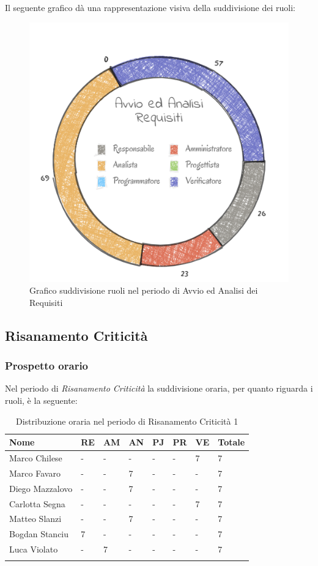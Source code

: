 Il seguente grafico dà una rappresentazione visiva della suddivisione dei ruoli:
\begin{figure}[H]
	\centering
  		\includegraphics[width=0.8\linewidth]{./images/torta_aar.png}
  		\caption{Grafico suddivisione ruoli nel periodo di Avvio ed Analisi dei Requisiti}
  		\label{fig:grafico suddivione ruoli periodo di Avvio ed analisi dei requisiti}
\end{figure}

\subsection{Risanamento Criticità}
\subsubsection{Prospetto orario}

Nel periodo di \textit{Risanamento Criticità} la suddivisione oraria, per quanto riguarda i ruoli, è la seguente:

\begin{longtable}{|C{.30\textwidth}|C{.06\textwidth}|C{.06\textwidth}|C{.06\textwidth} | C{.06\textwidth}| C{.06\textwidth} | C{.06\textwidth} | C{.10\textwidth} |}
\hline
\textbf{Nome} & \textbf{RE} & \textbf{AM} & \textbf{AN} & \textbf{PJ} & \textbf{PR} & \textbf{VE} & \textbf{Totale}\\
\hline 
Marco Chilese & - & - & - & - & - & 7 & 7 \\
\hline
Marco Favaro & - & - & 7 & - & - & - & 7 \\
\hline
Diego Mazzalovo & - & - & 7 & - & - & - & 7 \\
\hline
Carlotta Segna & - & - & - & - & - & 7 & 7 \\
\hline
Matteo Slanzi & - & - & 7 & - & - & - & 7 \\
\hline
Bogdan Stanciu & 7 & - & - & - & - & - & 7 \\
\hline
Luca Violato & - & 7 & - & - & - & - & 7 \\
\hline

\caption{Distribuzione oraria nel periodo di Risanamento Criticità 1}
\label{Distribuzione oraria del periodo di rc1}
\end{longtable}



